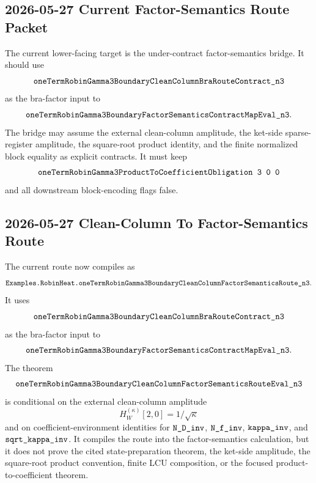 \subsection{2026-05-27 Current Factor-Semantics Route Packet}

The current lower-facing target is the under-contract factor-semantics bridge.
It should use
\[
  \texttt{oneTermRobinGamma3BoundaryCleanColumnBraRouteContract\_n3}
\]
as the bra-factor input to
\[
  \texttt{oneTermRobinGamma3BoundaryFactorSemanticsContractMapEval\_n3}.
\]
The bridge may assume the external clean-column amplitude, the ket-side
sparse-register amplitude, the square-root product identity, and the finite
normalized block equality as explicit contracts.  It must keep
\[
  \Lean{oneTermRobinGamma3ProductToCoefficientObligation\ 3\ 0\ 0}
\]
and all downstream block-encoding flags false.

\subsection{2026-05-27 Clean-Column To Factor-Semantics Route}

The current route now compiles as
\[
  \texttt{Examples.RobinHeat.oneTermRobinGamma3BoundaryCleanColumnFactorSemanticsRoute\_n3}.
\]
It uses
\[
  \texttt{oneTermRobinGamma3BoundaryCleanColumnBraRouteContract\_n3}
\]
as the bra-factor input to
\[
  \texttt{oneTermRobinGamma3BoundaryFactorSemanticsContractMapEval\_n3}.
\]
The theorem
\[
  \texttt{oneTermRobinGamma3BoundaryCleanColumnFactorSemanticsRouteEval\_n3}
\]
is conditional on the external clean-column amplitude
\[
  H_W^{(\kappa)}[2,0] = 1/\sqrt{\kappa}
\]
and on coefficient-environment identities for
\(\texttt{N\_D\_inv}\), \(\texttt{N\_f\_inv}\),
\(\texttt{kappa\_inv}\), and \(\texttt{sqrt\_kappa\_inv}\).  It compiles the
route into the factor-semantics calculation, but it does not prove the cited
state-preparation theorem, the ket-side amplitude, the square-root product
convention, finite LCU composition, or the focused product-to-coefficient
theorem.

